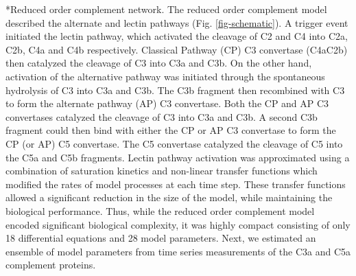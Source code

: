 \documentclass[12pt]{article}
\makeatletter
\renewcommand\subsection{\@startsection
	{subsection}{2}{0mm}
	{-0.05in}
	{-0.5\baselineskip}
	{\normalfont\normalsize\bfseries}}
\makeatother
\begin{document}
\subsection*{Reduced order complement network.}
The reduced order complement model described the alternate and lectin pathways (Fig. \ref{fig-schematic}).
A trigger event initiated the lectin pathway, which activated the cleavage of C2 and C4 into C2a, C2b, C4a and C4b respectively.
Classical Pathway (CP) C3 convertase (C4aC2b) then catalyzed the cleavage of C3 into C3a and C3b.
On the other hand, activation of the alternative pathway was initiated through the spontaneous hydrolysis of C3 into C3a and C3b.
The C3b fragment then recombined with C3 to form the alternate pathway (AP) C3 convertase.
Both the CP and AP C3 convertases catalyzed the cleavage of C3 into C3a and C3b.
A second C3b fragment could then bind with either the CP or AP C3 convertase to form the CP (or AP) C5 convertase.
The C5 convertase catalyzed the cleavage of C5 into the C5a and C5b fragments.
Lectin pathway activation was approximated using a combination of saturation kinetics and non-linear transfer functions which modified the rates of model processes at each time step. These transfer functions allowed a significant reduction in the size of the model, while maintaining the biological performance.
Thus, while the reduced order complement model encoded significant biological complexity, it was highly compact consisting of only 18 differential equations and 28 model parameters.
Next, we estimated an ensemble of model parameters from time series measurements of the C3a and C5a complement proteins.
\end{document}
